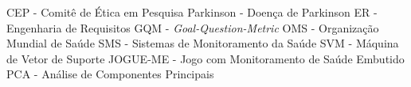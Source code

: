 CEP - Comitê de Ética em Pesquisa
Parkinson - Doença de Parkinson
ER - Engenharia de Requisitos
GQM - \textit{Goal-Question-Metric}
OMS - Organização Mundial de Saúde
SMS - Sistemas de Monitoramento da Saúde
SVM - Máquina de Vetor de Suporte
JOGUE-ME - Jogo com Monitoramento de Saúde Embutido
PCA - Análise de Componentes Principais
